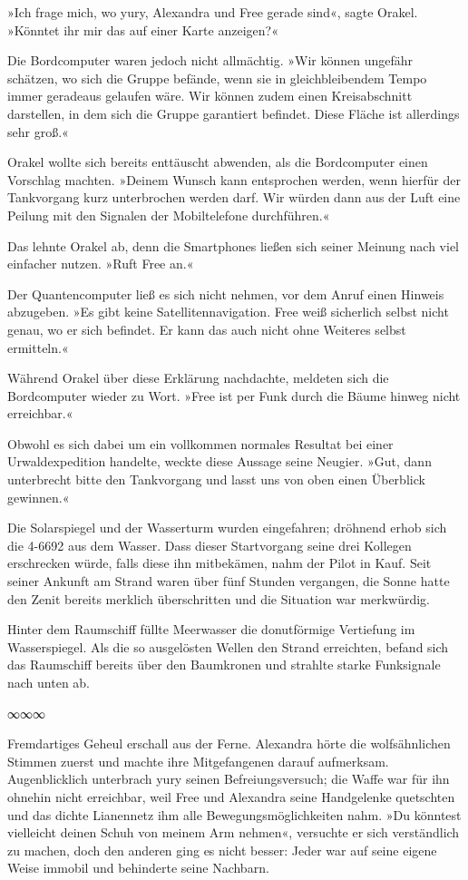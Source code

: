 »Ich frage mich, wo yury, Alexandra und Free gerade sind«, sagte Orakel. »Könntet ihr mir das auf einer Karte anzeigen?«

Die Bordcomputer waren jedoch nicht allmächtig. »Wir können ungefähr schätzen, wo sich die Gruppe befände, wenn sie in gleichbleibendem Tempo immer geradeaus gelaufen wäre. Wir können zudem einen Kreisabschnitt darstellen, in dem sich die Gruppe garantiert befindet. Diese Fläche ist allerdings sehr groß.«

Orakel wollte sich bereits enttäuscht abwenden, als die Bordcomputer einen Vorschlag machten. »Deinem Wunsch kann entsprochen werden, wenn hierfür der Tankvorgang kurz unterbrochen werden darf. Wir würden dann aus der Luft eine Peilung mit den Signalen der Mobiltelefone durchführen.«

Das lehnte Orakel ab, denn die Smartphones ließen sich seiner Meinung nach viel einfacher nutzen. »Ruft Free an.«

Der Quantencomputer ließ es sich nicht nehmen, vor dem Anruf einen Hinweis abzugeben. »Es gibt keine Satellitennavigation. Free weiß sicherlich selbst nicht genau, wo er sich befindet. Er kann das auch nicht ohne Weiteres selbst ermitteln.«

Während Orakel über diese Erklärung nachdachte, meldeten sich die Bordcomputer wieder zu Wort. »Free ist per Funk durch die Bäume hinweg nicht erreichbar.«

Obwohl es sich dabei um ein vollkommen normales Resultat bei einer Urwaldexpedition handelte, weckte diese Aussage seine Neugier. »Gut, dann unterbrecht bitte den Tankvorgang und lasst uns von oben einen Überblick gewinnen.«

Die Solarspiegel und der Wasserturm wurden eingefahren; dröhnend erhob sich die 4-6692 aus dem Wasser. Dass dieser Startvorgang seine drei Kollegen erschrecken würde, falls diese ihn mitbekämen, nahm der Pilot in Kauf. Seit seiner Ankunft am Strand waren über fünf Stunden vergangen, die Sonne hatte den Zenit bereits merklich überschritten und die Situation war merkwürdig.

Hinter dem Raumschiff füllte Meerwasser die donutförmige Vertiefung im Wasserspiegel. Als die so ausgelösten Wellen den Strand erreichten, befand sich das Raumschiff bereits über den Baumkronen und strahlte starke Funksignale nach unten ab.

\begin{center}
∞∞∞
\end{center}

Fremdartiges Geheul erschall aus der Ferne. Alexandra hörte die wolfsähnlichen Stimmen zuerst und machte ihre Mitgefangenen darauf aufmerksam. Augenblicklich unterbrach yury seinen Befreiungsversuch; die Waffe war für ihn ohnehin nicht erreichbar, weil Free und Alexandra seine Handgelenke quetschten und das dichte Lianennetz ihm alle Bewegungsmöglichkeiten nahm. »Du könntest vielleicht deinen Schuh von meinem Arm nehmen«, versuchte er sich verständlich zu machen, doch den anderen ging es nicht besser: Jeder war auf seine eigene Weise immobil und behinderte seine Nachbarn.

